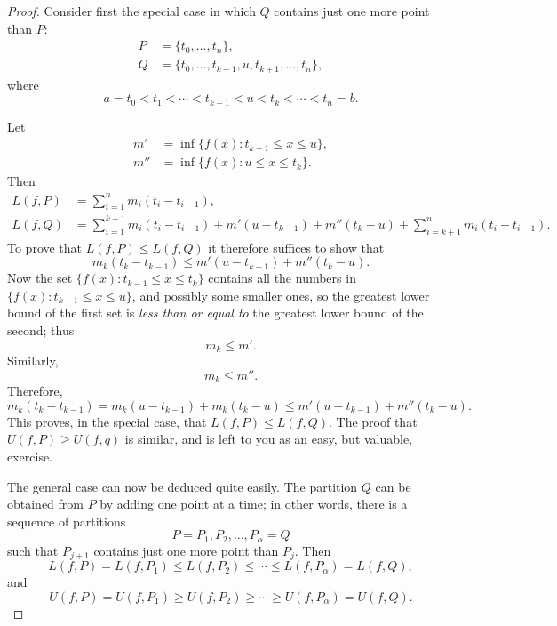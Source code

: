 \documentclass{article}
\begin{document}
\begin{proof}
  Consider first the special case in which $Q$ contains just one more point
  than $P$: \begin{align*}
    P &= \{t_0, \ldots, t_n\}, \\
    Q &= \{t_0, \ldots, t_{k - 1}, u, t_{k + 1}, \ldots, t_n\},
  \end{align*} where \begin{equation*}
    a = t_0 < t_1 < \cdots < t_{k - 1} < u < t_k < \cdots < t_n = b.
  \end{equation*}

  Let \begin{align*}
    m' &= \inf\{f(x): t_{k - 1} \leq x \leq u\}, \\
    m'' &= \inf\{f(x): u \leq x \leq t_k\}.
  \end{align*} Then \begin{align*}
    L(f, P) &= \sum_{i = 1}^n m_i(t_i - t_{i - 1}), \\
    L(f, Q) &= \sum_{i = 1}^{k - 1} m_i(t_i - t_{i - 1}) + m'(u - t_{k - 1}) +
      m''(t_k - u) + \sum_{i = k + 1}^n m_i(t_i - t_{i - 1}).
  \end{align*} To prove that $L(f, P) \leq L(f, Q)$ it therefore suffices to
  show that \begin{equation*}
    m_k(t_k - t_{k - 1}) \leq m'(u - t_{k - 1}) + m''(t_k - u).
  \end{equation*} Now the set $\{f(x): t_{k - 1} \leq x \leq t_k\}$ contains
  all the numbers in $\{f(x): t_{k - 1} \leq x \leq u\}$, and possibly some
  smaller ones, so the greatest lower bound of the first set is \emph{less than
  or equal to} the greatest lower bound of the second; thus \begin{equation*}
    m_k \leq m'.
  \end{equation*} Similarly, \begin{equation*}
    m_k \leq m''.
  \end{equation*} Therefore, \begin{equation*}
    m_k(t_k - t_{k - 1}) = m_k(u - t_{k - 1}) + m_k(t_k - u) \leq m'(u - t_{k -
      1}) + m''(t_k - u).
  \end{equation*} This proves, in the special case, that $L(f, P) \leq L(f,
  Q)$. The proof that $U(f, P) \geq U(f, q)$ is similar, and is left to you as
  an easy, but valuable, exercise.

  The general case can now be deduced quite easily. The partition $Q$ can be
  obtained from $P$ by adding one point at a time; in other words, there is a
  sequence of partitions \begin{equation*}
    P = P_1, P_2, \ldots, P_{\alpha} = Q
  \end{equation*} such that $P_{j + 1}$ contains just one more point than
  $P_j$. Then \begin{equation*}
    L(f, P) = L(f, P_1) \leq L(f, P_2) \leq \cdots \leq L(f, P_{\alpha}) = L(f,
      Q),
  \end{equation*} and \begin{equation*}
    U(f, P) = U(f, P_1) \geq U(f, P_2) \geq \cdots \geq U(f, P_{\alpha}) = U(f,
      Q).
  \end{equation*}
\end{proof}
\end{document}
